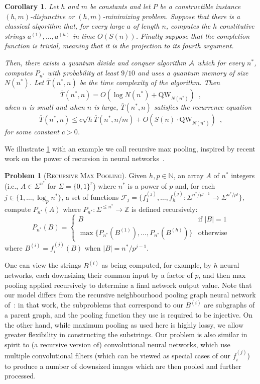 \documentclass[12pt]{article}
\newcommand{\qw}{\mathrm{QW}}
\newcommand{\RMP}{\textsc{Recursive Max Pooling}}
\newtheorem{corollary}[theorem]{Corollary}
\theoremstyle{definition}
\newtheorem{problem}[theorem]{Problem}
\begin{document}
\begin{corollary}
\label{cor:classical}
Let $h$ and $m$ be constants and let $P$ be a constructible instance $(h,m)$-{disjunctive} or $(h,m)$-{minimizing} problem. 
Suppose that there is a classical algorithm that, for every large $a$ of length $n$, computes the $h$ constitutive strings $a^{(1)}, \ldots , a^{(h)}$ in time $O(S(n))$.
Finally suppose that the completion function is trivial, meaning that it is the projection to its fourth argument.

Then, there exists a quantum divide and conquer algorithm ${\cal A}$ which for every $n^*$, computes $P_{n^*}$ with probability at least $9/10$ and uses a quantum memory of size $N(n^*)$.
Let $\overline{T}(n^*, n)$ be the time complexity of the algorithm. Then
\[
\overline{T}(n^*, n) = O(\log  N(n^*) + \qw_{N(n^*)})  \enspace,
\]
when $n$ is small and when $n$ is large, $\overline{T}(n^*, n)$ satisfies the recurrence equation
\[
\overline{T}(n^*, n) \leq c \sqrt{h} \overline{T}(n^*, n/m)   + {O} \left( S(n) \cdot \qw_{N(n^*)} \right) \enspace,
\]
for some constant $c > 0$.
\end{corollary}

We illustrate \cref{cor:classical} with an example we call recursive max pooling, inspired by recent work on the power of recursion in neural networks~\cite{tahmasebi2023power}.

\begin{problem}[\RMP] 
Given $h, p\in\mathbb{N}$, an array $A$ of $n^*$ integers (i.e., $A\in\Sigma^{n^*}$ for $\Sigma=\{0,1\}^r$) where $n^*$ is a power of $p$ and, for each $j\in\{1,\ldots, \log_p n^*\}$, a set of functions $\mathcal{F}_j =\{f^{(j)}_1, \ldots, f^{(j)}_h:\Sigma^{n^*/p^{j-1}}\rightarrow\Sigma^{n^*/p^j}\}$, compute $P_{n^*}(A)$ where $P_{n^*}:\Sigma^{\le n^*}\rightarrow\mathbb{Z}$ is defined recursively:
$$
P_{n^*}(B) = \begin{cases} 
B &\text{if }|B| = 1\\ 
\max \{{P_{n^*}(B^{(1)}), \ldots, P_{n^*}(B^{(h)})}\} & \text{otherwise}
\end{cases}
$$
where $B^{(i)} = f_i^{(j)}(B)$ when $|B| = n^*/p^{j-1}$.
\end{problem} 

One can view the strings $B^{(i)}$ as being computed, for example, by $h$ neural networks, each downsizing their common input by a factor of $p$, and then max pooling applied recursively to determine a final network output value. Note that our model differs from the recursive neighbourhood pooling graph neural network of~\cite{tahmasebi2023power}: in that work, the subproblems that correspond to our $B^{(i)}$ are subgraphs of a parent graph, and the pooling function they use is required to be injective. On the other hand, while maximum pooling as used here is highly lossy, we allow greater flexibility in constructing the substrings. Our problem is also similar in spirit to (a recursive version of) convolutional neural networks, which use multiple convolutional filters (which can be viewed as special cases of our $f^{(j)}_i$) to produce a number of downsized images which are then pooled and further processed. 
\end{document}
